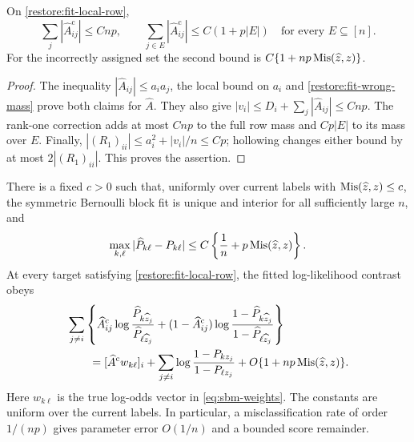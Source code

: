 \begin{lemma}
\label{restore:fit-local-mass}
On \eqref{restore:fit-local-row},
\begin{equation}\label{restore:fit-local-mass-bounds}
 \sum_j|\widehat A^{\mathrm{c}}_{ij}|\le Cnp,\qquad
 \sum_{j\in E}|\widehat A^{\mathrm{c}}_{ij}|\le C(1+p|E|)
       \quad\text{for every }E\subseteq[n].
\end{equation}
For the incorrectly assigned set the second bound is
$C\{1+np\operatorname{Mis}(\widehat z,z)\}$.
\end{lemma}

\begin{proof}
The inequality $|\widehat A_{ij}|\le a_ia_j$, the local bound on $a_i$ and
\cref{restore:fit-wrong-mass} prove both claims for $\widehat A$.
They also give $|v_i|\le D_i+\sum_j|\widehat A_{ij}|\le Cnp$.
The rank-one correction adds at most $Cnp$ to the full row mass and
$Cp|E|$ to its mass over $E$. Finally,
$|(R_1)_{ii}|\le a_i^2+|v_i|/n\le Cp$; hollowing changes either
bound by at most $2|(R_1)_{ii}|$. This proves the assertion.
\end{proof}

\begin{proposition}
\label{restore:fit-ordinary}
\label{restore:fit-score}
There is a fixed $c>0$ such that, uniformly over current labels with
$\operatorname{Mis}(\widehat z,z)\le c$, the symmetric Bernoulli block fit is unique
and interior for all sufficiently large $n$, and
\begin{equation}\label{restore:fit-ordinary-parameter}
 \max_{k,\ell}|\widehat P_{k\ell}-P_{k\ell}|
 \le C\left\{\frac1n+p\operatorname{Mis}(\widehat z,z)\right\}.
\end{equation}
At every target satisfying \eqref{restore:fit-local-row}, the fitted
log-likelihood contrast obeys
\begin{equation}\label{restore:fit-ordinary-score}
 \begin{aligned}
 &\sum_{j\ne i}\left\{
 \widehat A^{\mathrm{c}}_{ij}\log\frac{\widehat P_{k\widehat z_j}}
                              {\widehat P_{\ell\widehat z_j}}
 +(1-\widehat A^{\mathrm{c}}_{ij})\log\frac{1-\widehat P_{k\widehat z_j}}
                                   {1-\widehat P_{\ell\widehat z_j}}
 \right\}\\
 &\qquad=[\widehat A^{\mathrm{c}} w_{k\ell}]_i
       +\sum_{j\ne i}\log\frac{1-P_{kz_j}}{1-P_{\ell z_j}}
       +O\{1+np\operatorname{Mis}(\widehat z,z)\}.
 \end{aligned}
\end{equation}
Here $w_{k\ell}$ is the true log-odds vector in
\eqref{eq:sbm-weights}. The constants are uniform over the current
labels. In particular, a misclassification rate of order $1/(np)$
gives parameter error $O(1/n)$ and a bounded score remainder.
\end{proposition}

